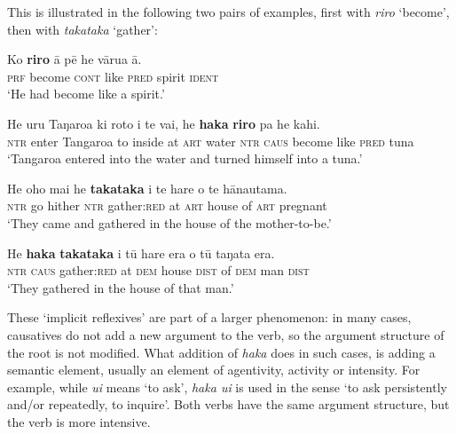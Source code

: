 This is illustrated in the following two pairs of examples, first with \textit{riro} ‘become’, then with \textit{takataka} ‘gather’:

\ea\label{ex:8.240}
\gll Ko \textbf{riro} {\ꞌ}ā pē he vārua {\ꞌ}ā. \\
\textsc{prf} become \textsc{cont} like \textsc{pred} spirit \textsc{ident} \\

\glt 
‘He had become like a spirit.’ \textstyleExampleref{[R310.268]} 
\z

\ea\label{ex:8.241}
\gll He uru Taŋaroa ki roto i te vai, he \textbf{haka} \textbf{riro} pa he kahi. \\
\textsc{ntr} enter Tangaroa to inside at \textsc{art} water \textsc{ntr} \textsc{caus} become like \textsc{pred} tuna \\

\glt 
‘Tangaroa entered into the water and turned himself into a tuna.’ \textstyleExampleref{[Fel-046.020]}
\z

\ea\label{ex:8.242}
\gll He oho mai he \textbf{takataka} {\ꞌ}i te hare o te hānautama. \\
\textsc{ntr} go hither \textsc{ntr} gather:\textsc{red} at \textsc{art} house of \textsc{art} pregnant \\

\glt 
‘They came and gathered in the house of the mother-to-be.’ \textstyleExampleref{[Ley-9-55.024]}
\z

\ea\label{ex:8.243}
\gll He \textbf{haka} \textbf{takataka} {\ꞌ}i tū hare era o tū taŋata era. \\
\textsc{ntr} \textsc{caus} gather:\textsc{red} at \textsc{dem} house \textsc{dist} of \textsc{dem} man \textsc{dist} \\

\glt
‘They gathered in the house of that man.’ \textstyleExampleref{[R352.079]} 
\z

These ‘implicit reflexives’ are part of a larger phenomenon: in many cases, causatives do not add a new argument to the verb, so the argument structure of the root is not modified. What addition of \textit{haka} does in such cases, is adding a semantic element, usually an element of agentivity, activity or intensity. For example, while \textit{{\ꞌ}ui} means ‘to ask’, \textit{haka {\ꞌ}ui} is used in the sense ‘to ask persistently and/or repeatedly, to inquire’. Both verbs have the same argument structure, but the  verb is more intensive.

